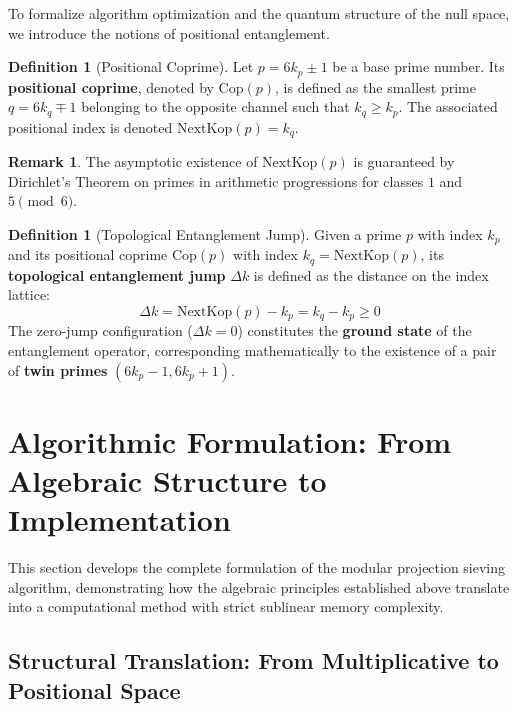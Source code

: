 \documentclass{article}
\numberwithin{equation}{section}
\theoremstyle{plain}
\theoremstyle{definition}
\newtheorem{definition}[theorem]{Definition}
\newtheorem{remark}[theorem]{Remark}
\begin{document}
To formalize algorithm optimization and the quantum structure of the null space, we introduce the notions of positional entanglement.

\begin{definition}[Positional Coprime]
\label{def:coprimo-posicional}
Let $p = 6k_p \pm 1$ be a base prime number. Its \textbf{positional coprime}, denoted by $\mathrm{Cop}(p)$, is defined as the smallest prime $q = 6k_q \mp 1$ belonging to the opposite channel such that $k_q \ge k_p$. The associated positional index is denoted $\mathrm{NextKop}(p) = k_q$.
\end{definition}

\begin{remark}
The asymptotic existence of $\mathrm{NextKop}(p)$ is guaranteed by Dirichlet's Theorem on primes in arithmetic progressions for classes $1$ and $5 \pmod{6}$.
\end{remark}

\begin{definition}[Topological Entanglement Jump]
\label{def:salto-topologico}
Given a prime $p$ with index $k_p$ and its positional coprime $\mathrm{Cop}(p)$ with index $k_q = \mathrm{NextKop}(p)$, its \textbf{topological entanglement jump} $\Delta k$ is defined as the distance on the index lattice:
\begin{equation}
\Delta k = \mathrm{NextKop}(p) - k_p = k_q - k_p \ge 0
\end{equation}
The zero-jump configuration ($\Delta k = 0$) constitutes the \textbf{ground state} of the entanglement operator, corresponding mathematically to the existence of a pair of \textbf{twin primes} $(6k_p - 1, 6k_p + 1)$.
\end{definition}

\section{Algorithmic Formulation: From Algebraic Structure to Implementation}
\label{sec:formulacion-algoritmica}

This section develops the complete formulation of the modular projection sieving algorithm, demonstrating how the algebraic principles established above translate into a computational method with strict sublinear memory complexity.

\subsection{Structural Translation: From Multiplicative to Positional Space}
\end{document}
